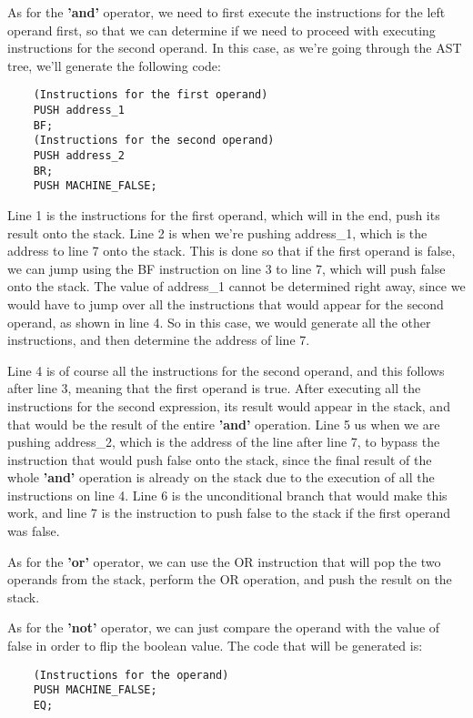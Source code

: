 \documentclass{article}
\begin{document}
As for the \textbf{'and'} operator, we need to first execute the instructions for the left operand first, so that we can determine if we need to proceed with executing instructions for the second operand. In this case, as we're going through the AST tree, we'll generate the following code:

\begin{lstlisting}
    (Instructions for the first operand)
    PUSH address_1
    BF;
    (Instructions for the second operand)
    PUSH address_2
    BR;
    PUSH MACHINE_FALSE;
\end{lstlisting}

Line 1 is the instructions for the first operand, which will in the end, push its result onto the stack. Line 2 is when we're pushing address\_1, which is the address to line 7 onto the stack. This is done so that if the first operand is false, we can jump using the BF instruction on line 3 to line 7, which will push false onto the stack. The value of address\_1 cannot be determined right away, since we would have to jump over all the instructions that would appear for the second operand, as shown in line 4. So in this case, we would generate all the other instructions, and then determine the address of line 7.

Line 4 is of course all the instructions for the second operand, and this follows after line 3, meaning that the first operand is true. After executing all the instructions for the second expression, its result would appear in the stack, and that would be the result of the entire \textbf{'and'} operation. Line 5 us when we are pushing address\_2, which is the address of the line after line 7, to bypass the instruction that would push false onto the stack, since the final result of the whole \textbf{'and'} operation is already on the stack due to the execution of all the instructions on line 4. Line 6 is the unconditional branch that would make this work, and line 7 is the instruction to push false to the stack if the first operand was false.

As for the \textbf{'or'} operator, we can use the OR instruction that will pop the two operands from the stack, perform the OR operation, and push the result on the stack.

As for the \textbf{'not'} operator, we can just compare the operand with the value of false in order to flip the boolean value. The code that will be generated is:

\begin{lstlisting}
    (Instructions for the operand)
    PUSH MACHINE_FALSE;
    EQ;
\end{lstlisting}
\end{document}
